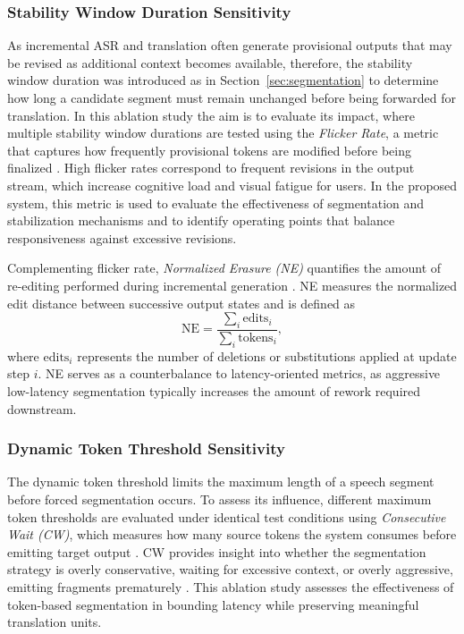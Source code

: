 \subsubsection{Stability Window Duration Sensitivity}
As incremental ASR and translation often generate provisional outputs that may be revised as additional context becomes available, therefore, the stability window duration was introduced as in Section~\ref{sec:segmentation} to determine how long a candidate segment must remain unchanged before being forwarded for translation. In this ablation study the aim is to evaluate its impact, where multiple stability window durations are tested using the \emph{Flicker Rate}, a metric that captures how frequently provisional tokens are modified before being finalized \cite{rausei2023ralle}. High flicker rates correspond to frequent revisions in the output stream, which increase cognitive load and visual fatigue for users. In the proposed system, this metric is used to evaluate the effectiveness of segmentation and stabilization mechanisms and to identify operating points that balance responsiveness against excessive revisions.

Complementing flicker rate, \emph{Normalized Erasure (NE)} quantifies the amount of re-editing performed during incremental generation \cite{zhang2021beyond, arivazhagan2019retranslation}. NE measures the normalized edit distance between successive output states and is defined as
\begin{equation}
\text{NE} = \frac{\sum_{i} \text{edits}_i}{\sum_{i} \text{tokens}_i},
\end{equation}
where $\text{edits}_i$ represents the number of deletions or substitutions applied at update step $i$. NE serves as a counterbalance to latency-oriented metrics, as aggressive low-latency segmentation typically increases the amount of rework required downstream.


\subsubsection{Dynamic Token Threshold Sensitivity}
The dynamic token threshold limits the maximum length of a speech segment before forced segmentation occurs. To assess its influence, different maximum token thresholds are evaluated under identical test conditions using \emph{Consecutive Wait (CW)}, which measures how many source tokens the system consumes before emitting target output \cite{kano2023averaged, li2022system, simtrans_quality_latency_2022}. CW provides insight into whether the segmentation strategy is overly conservative, waiting for excessive context, or overly aggressive, emitting fragments prematurely \cite{simtrans_quality_latency_2022}. This ablation study assesses the effectiveness of token-based segmentation in bounding latency while preserving meaningful translation units.


